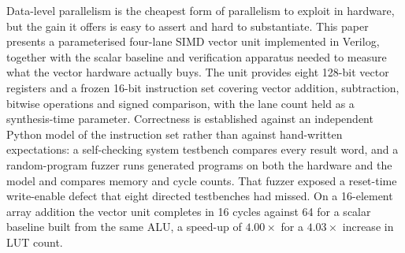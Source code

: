 
Data-level parallelism is the cheapest form of parallelism to exploit in
hardware, but the gain it offers is easy to assert and hard to substantiate.
This paper presents a parameterised four-lane SIMD vector unit implemented in
Verilog, together with the scalar baseline and verification apparatus needed to
measure what the vector hardware actually buys. The unit provides eight 128-bit
vector registers and a frozen 16-bit instruction set covering vector addition,
subtraction, bitwise operations and signed comparison, with the lane count held
as a synthesis-time parameter. Correctness is established against an independent
Python model of the instruction set rather than against hand-written
expectations: a self-checking system testbench compares every result word, and a
random-program fuzzer runs generated programs on both the hardware and the model
and compares memory and cycle counts. That fuzzer exposed a reset-time
write-enable defect that eight directed testbenches had missed. On a 16-element
array addition the vector unit completes in 16 cycles against 64 for a scalar
baseline built from the same ALU, a speed-up of $4.00\times$ for a
$4.03\times$ increase in LUT count.
